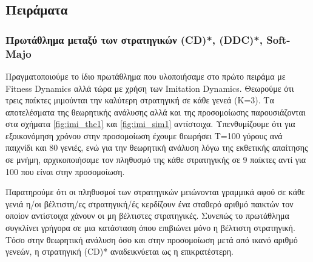 \documentclass[a4paper,12pt]{article}
\begin{document}
\subsection{Πειράματα}
\subsubsection*{Πρωτάθλημα μεταξύ των στρατηγικών \foreignlanguage{english}{(CD)*, (DDC)*, Soft-Majo}}
Πραγματοποιούμε το ίδιο πρωτάθλημα που υλοποιήσαμε στο πρώτο πειράμα με \foreignlanguage{english}{Fitness Dynamics} αλλά τώρα με χρήση των \foreignlanguage{english}{Imitation Dynamics}. Θεωρούμε ότι τρεις παίκτες μιμούνται την καλύτερη στρατηγική σε κάθε γενεά (Κ=3). Τα αποτελέσματα της θεωρητικής ανάλυσης αλλά και της προσομοίωσης παρουσιάζονται στα σχήματα \ref{fig:imi_the1} και \ref{fig:imi_sim1} αντίστοιχα. Υπενθυμίζουμε ότι για εξοικονόμηση χρόνου στην προσομοίωση έχουμε θεωρήσει Τ=100 γύρους ανά παιχνίδι και 80 γενιές, ενώ για την θεωρητική ανάλυση λόγω της εκθετικής απαίτησης σε μνήμη, αρχικοποιήσαμε τον πληθυσμό της κάθε στρατηγικής σε 9 παίκτες αντί για 100 που είναι στην προσομοίωση.

Παρατηρούμε ότι οι πληθυσμοί των στρατηγικών μειώνονται γραμμικά αφού σε κάθε γενιά η/οι βέλτιστη/ες στρατηγική/ές κερδίζουν ένα σταθερό αριθμό παικτών τον οποίον αντίστοιχα χάνουν οι μη βέλτιστες στρατηγικές. Συνεπώς το πρωτάθλημα συγκλίνει γρήγορα σε μια κατάσταση όπου επιβιώνει μόνο η βέλτιστη στρατηγική.
Τόσο στην θεωρητική ανάλυση όσο και στην προσομοίωση μετά από ικανό αριθμό γενεών, η στρατηγική \foreignlanguage{english}{(CD)*} αναδεικνύεται ως η επικρατέστερη.
\end{document}
